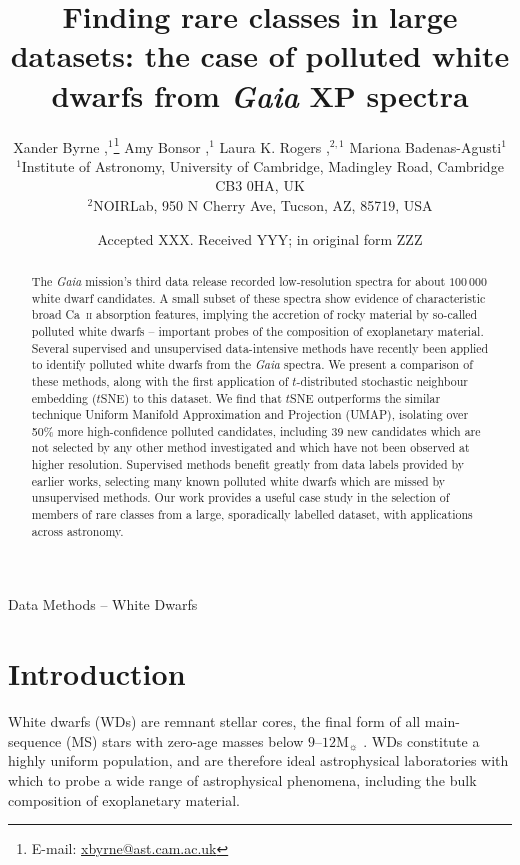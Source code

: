 \documentclass[fleqn,usenatbib]{rasti}
\title[
    Polluted white dwarfs from \textit{Gaia} XP spectra
]{
    Finding rare classes in large datasets: the case of polluted white dwarfs from \textit{Gaia} XP spectra
}
\author[
    X. Byrne et al.
]{
    Xander Byrne
    \orcidlink{0000-0001-9488-238X},$^{1}$\thanks{E-mail: \href{mailto:xbyrne@ast.cam.ac.uk}{xbyrne@ast.cam.ac.uk}}
    Amy Bonsor
    \orcidlink{0000-0002-8070-1901},$^{1}$
    Laura K. Rogers
    \orcidlink{0000-0002-3553-9474},$^{2,1}$
    Mariona Badenas-Agusti$^{1}$
    \orcidlink{0000-0003-4903-567X}
\\
$^{1}$Institute of Astronomy, University of Cambridge, Madingley Road, Cambridge CB3 0HA, UK\\
$^{2}$NOIRLab, 950 N Cherry Ave, Tucson, AZ, 85719, USA\\
}
\date{Accepted XXX. Received YYY; in original form ZZZ}
\begin{document}
\label{firstpage}
\pagerange{\pageref{firstpage}--\pageref{lastpage}}
\maketitle

\begin{abstract}
The \textit{Gaia} mission's third data release recorded low-resolution spectra for about $100\,000$ white dwarf candidates.
A small subset of these spectra show evidence of characteristic broad Ca~\textsc{ii} absorption features, implying the accretion of rocky material by so-called polluted white dwarfs -- important probes of the composition of exoplanetary material.
Several supervised and unsupervised data-intensive methods have recently been applied to identify polluted white dwarfs from the \textit{Gaia} spectra.
We present a comparison of these methods, along with the first application of $t$-distributed stochastic neighbour embedding ($t$SNE) to this dataset.
We find that $t$SNE outperforms the similar technique Uniform Manifold Approximation and Projection (UMAP), isolating over 50\% more high-confidence polluted candidates, including 39 new candidates which are not selected by any other method investigated and which have not been observed at higher resolution.
Supervised methods benefit greatly from data labels provided by earlier works, selecting many known polluted white dwarfs which are missed by unsupervised methods.
Our work provides a useful case study in the selection of members of rare classes from a large, sporadically labelled dataset, with applications across astronomy.
\end{abstract}

\begin{keywords}
Data Methods -- White Dwarfs
\end{keywords}



\section{Introduction}

White dwarfs (WDs) are remnant stellar cores, the final form of all main-sequence (MS) stars with zero-age masses below $9$--$12\mathrm{M}_{\sun}$ \citep{althaus10, althaus21, lauffer18}.
WDs constitute a highly uniform population, and are therefore ideal astrophysical laboratories with which to probe a wide range of astrophysical phenomena, including the bulk composition of exoplanetary material.
\end{document}
